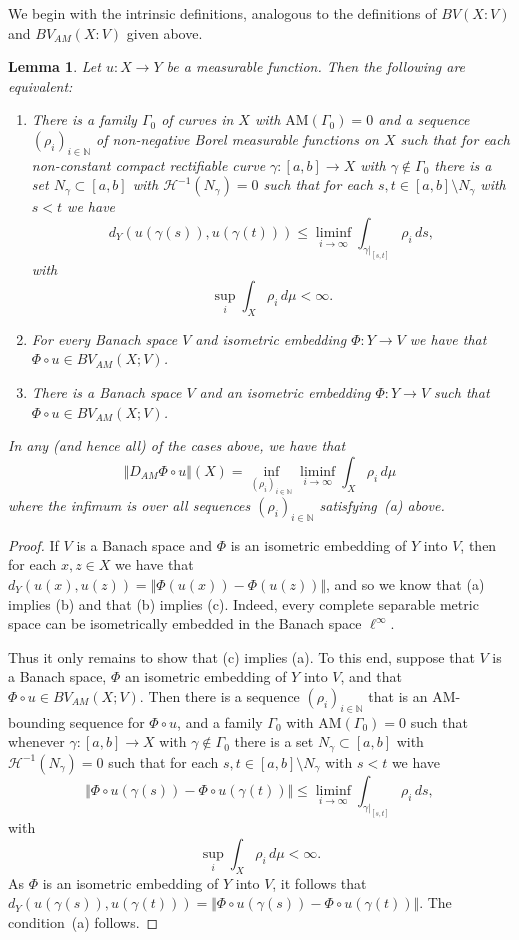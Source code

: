 \documentclass[11pt, letterpaper]{amsart} %
\newcommand*{\N}{{\mathbb N}}
\newcommand*{\AM}{\text{AM}}
\numberwithin{equation}{section}
\theoremstyle{plain}
\newtheorem{lemma}[equation]{Lemma}
\theoremstyle{definition}
\begin{document}
{We begin with the intrinsic definitions, analogous to the definitions of $BV(X:V)$ and $BV_{AM}(X:V)$ given above. 

\begin{lemma}\label{lem:BV-AM-metric}
Let $u:X\to Y$ be a measurable function. Then the following are equivalent:
\begin{enumerate}
\item[(a)] There is a family $\Gamma_0$ of curves in $X$ with $\AM(\Gamma_0)=0$ and a sequence $(\rho_i)_{i\in\N}$
of non-negative Borel measurable functions on $X$ such that for each non-constant compact rectifiable curve 
$\gamma:[a,b]\to X$ with $\gamma\not\in\Gamma_0$ there is a set $N_\gamma\subset[a,b]$ with 
$\mathcal{H}^{-1}(N_\gamma)=0$ such that for each $s,t\in[a,b]\setminus N_\gamma$ with $s<t$ we have
\[
d_Y(u(\gamma(s)),u(\gamma(t)))\le \liminf_{i\to\infty}\int_{\gamma\vert_{[s,t]}}\rho_i\, ds,
\]
with 
\[
\sup_i\int_X\rho_i\, d\mu<\infty.
\]
\item[(b)] For every Banach space $V$ and isometric embedding $\Phi:Y\to V$ we have that $\Phi\circ u\in BV_{AM}(X;V)$.
\item[(c)] There is a Banach space $V$ and an isometric embedding 
$\Phi:Y\to V$ such that $\Phi\circ u\in BV_{AM}(X;V)$.
\end{enumerate}
In any (and hence all) of the cases above, we have that
\[
\Vert D_{AM}\Phi\circ u\Vert(X)=\inf_{(\rho_i)_{i\in\N}}\liminf_{i\to\infty} \int_X\rho_i\, d\mu
\]
where the infimum is over all sequences $(\rho_i)_{i\in\N}$ satisfying~(a) above.
\end{lemma}

\begin{proof}
If $V$ is a Banach space and $\Phi$ is an isometric embedding of $Y$ into $V$, then for each $x,z\in X$ we have that
$d_Y(u(x),u(z))=\Vert \Phi(u(x))-\Phi(u(z))\Vert$, and so we know that (a) implies (b) and that (b) implies (c).
Indeed, every complete separable metric space can be isometrically embedded in the Banach space $\ell^\infty$.

Thus it only remains to show that (c) implies (a). To this end, suppose that $V$ is a Banach space, $\Phi$ an isometric
embedding of $Y$ into $V$, and that $\Phi\circ u\in BV_{AM}(X;V)$. Then there is a sequence $(\rho_i)_{i\in\N}$
that is an AM-bounding sequence for $\Phi\circ u$, and a family $\Gamma_0$ with $\AM(\Gamma_0)=0$ such that
whenever
$\gamma:[a,b]\to X$ with $\gamma\not\in\Gamma_0$ there is a set $N_\gamma\subset[a,b]$ with 
$\mathcal{H}^{-1}(N_\gamma)=0$ such that for each $s,t\in[a,b]\setminus N_\gamma$ with $s<t$ we have
\[
\Vert\Phi\circ u(\gamma(s))-\Phi\circ u(\gamma(t))\Vert\le \liminf_{i\to\infty}\int_{\gamma\vert_{[s,t]}}\rho_i\, ds,
\]
with 
\[
\sup_i\int_X\rho_i\, d\mu<\infty.
\]
As $\Phi$ is an isometric embedding of $Y$ into $V$, it follows that 
$d_Y(u(\gamma(s)), u(\gamma(t)))=\Vert\Phi\circ u(\gamma(s))-\Phi\circ u(\gamma(t))\Vert$. The condition~(a) follows.


\end{proof}}
\end{document}
